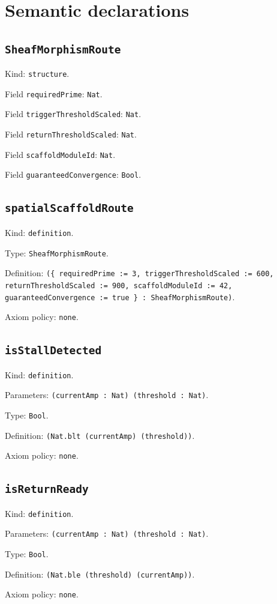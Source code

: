 \documentclass[11pt]{article}
\begin{document}
\section*{Semantic declarations}
\subsection*{\texttt{SheafMorphismRoute}}
\noindent Kind: \texttt{structure}.\par
\noindent Field \texttt{requiredPrime}: \texttt{Nat}.\par
\noindent Field \texttt{triggerThresholdScaled}: \texttt{Nat}.\par
\noindent Field \texttt{returnThresholdScaled}: \texttt{Nat}.\par
\noindent Field \texttt{scaffoldModuleId}: \texttt{Nat}.\par
\noindent Field \texttt{guaranteedConvergence}: \texttt{Bool}.\par
\subsection*{\texttt{spatialScaffoldRoute}}
\noindent Kind: \texttt{definition}.\par
\noindent Type: \texttt{SheafMorphismRoute}.\par
\noindent Definition: \texttt{(\{ requiredPrime := 3, triggerThresholdScaled := 600, returnThresholdScaled := 900, scaffoldModuleId := 42, guaranteedConvergence := true \} : SheafMorphismRoute)}.\par
\noindent Axiom policy: \texttt{none}.\par
\subsection*{\texttt{isStallDetected}}
\noindent Kind: \texttt{definition}.\par
\noindent Parameters: \texttt{(currentAmp : Nat) (threshold : Nat)}.\par
\noindent Type: \texttt{Bool}.\par
\noindent Definition: \texttt{(Nat.blt (currentAmp) (threshold))}.\par
\noindent Axiom policy: \texttt{none}.\par
\subsection*{\texttt{isReturnReady}}
\noindent Kind: \texttt{definition}.\par
\noindent Parameters: \texttt{(currentAmp : Nat) (threshold : Nat)}.\par
\noindent Type: \texttt{Bool}.\par
\noindent Definition: \texttt{(Nat.ble (threshold) (currentAmp))}.\par
\noindent Axiom policy: \texttt{none}.\par
\end{document}
